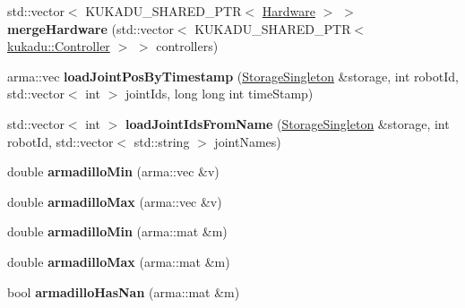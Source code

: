\begin{DoxyCompactItemize}
\item 
std\+::vector$<$ K\+U\+K\+A\+D\+U\+\_\+\+S\+H\+A\+R\+E\+D\+\_\+\+P\+TR$<$ \hyperlink{classkukadu_1_1Hardware}{Hardware} $>$ $>$ {\bfseries merge\+Hardware} (std\+::vector$<$ K\+U\+K\+A\+D\+U\+\_\+\+S\+H\+A\+R\+E\+D\+\_\+\+P\+TR$<$ \hyperlink{classkukadu_1_1Controller}{kukadu\+::\+Controller} $>$ $>$ controllers)\hypertarget{namespacekukadu_ab8292f47b70080fe31dcbf6c65f88d32}{}\label{namespacekukadu_ab8292f47b70080fe31dcbf6c65f88d32}

\item 
arma\+::vec {\bfseries load\+Joint\+Pos\+By\+Timestamp} (\hyperlink{classkukadu_1_1StorageSingleton}{Storage\+Singleton} \&storage, int robot\+Id, std\+::vector$<$ int $>$ joint\+Ids, long long int time\+Stamp)\hypertarget{namespacekukadu_a91da90dc1e61e09ec4644d0de0732b3f}{}\label{namespacekukadu_a91da90dc1e61e09ec4644d0de0732b3f}

\item 
std\+::vector$<$ int $>$ {\bfseries load\+Joint\+Ids\+From\+Name} (\hyperlink{classkukadu_1_1StorageSingleton}{Storage\+Singleton} \&storage, int robot\+Id, std\+::vector$<$ std\+::string $>$ joint\+Names)\hypertarget{namespacekukadu_a86c68c4fd2adcff11d0901b276af4e42}{}\label{namespacekukadu_a86c68c4fd2adcff11d0901b276af4e42}

\item 
double {\bfseries armadillo\+Min} (arma\+::vec \&v)\hypertarget{namespacekukadu_aa69e410b88e68b8aed567e98003b64bd}{}\label{namespacekukadu_aa69e410b88e68b8aed567e98003b64bd}

\item 
double {\bfseries armadillo\+Max} (arma\+::vec \&v)\hypertarget{namespacekukadu_a68acbf52eaadd096bb24f807d59b3120}{}\label{namespacekukadu_a68acbf52eaadd096bb24f807d59b3120}

\item 
double {\bfseries armadillo\+Min} (arma\+::mat \&m)\hypertarget{namespacekukadu_af4f5633bb02cd8f46498d2579461a007}{}\label{namespacekukadu_af4f5633bb02cd8f46498d2579461a007}

\item 
double {\bfseries armadillo\+Max} (arma\+::mat \&m)\hypertarget{namespacekukadu_a6ae73c2ca69337704dac9eac50225db4}{}\label{namespacekukadu_a6ae73c2ca69337704dac9eac50225db4}

\item 
bool {\bfseries armadillo\+Has\+Nan} (arma\+::mat \&m)\hypertarget{namespacekukadu_ac6f428898e1c5fc821b59660dcbd30af}{}\label{namespacekukadu_ac6f428898e1c5fc821b59660dcbd30af}


\end{DoxyCompactItemize}
